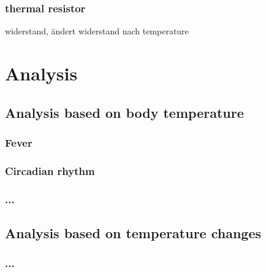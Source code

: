 \subsubsection{thermal resistor}
 widerstand, ändert widerstand nach temperature
 
\section{Analysis}
\subsection{Analysis based on body temperature}
\subsubsection{Fever}
\subsubsection{Circadian rhythm}
\subsubsection{...}

\subsection{Analysis based on temperature changes}
\subsubsection{...}
